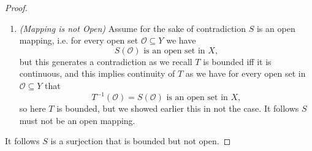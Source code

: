 \documentclass[12pt]{article}
\newenvironment{ex}[2][Exercise]{\begin{trivlist}
\item[\hskip \labelsep {\bfseries #1}\hskip \labelsep {\bfseries #2.}]}{\end{trivlist}}
\begin{document}
\begin{ex}{6}
\begin{enumerate}[label=(\alph*)]
\begin{proof}
\begin{enumerate}[label=(\roman*)]
                \item \textit{(Mapping is not Open)} Assume for the sake of contradiction $S$ is an open mapping, i.e. for every open set $\mathcal{O} \subseteq Y$ we have
                $$S(\mathcal{O}) \text{ is an open set in }X,$$
                but this generates a contradiction as we recall $T$ is bounded iff it is continuous, and this implies continuity of $T$ as we have for every open set in $\mathcal{O} \subseteq Y$ that
                $$T^{-1}(\mathcal{O}) = S(\mathcal{O}) \text{ is an open set in }X,$$
                so here $T$ is bounded, but we showed earlier this in not the case. It follows $S$ must not be an open mapping.
            \end{enumerate}
            It follows $S$ is a surjection that is bounded but not open.
        \end{proof}
    \end{enumerate}
\end{ex}
\end{document}
